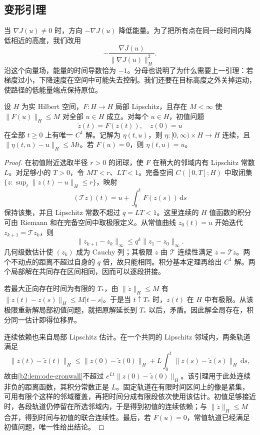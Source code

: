 \subsection{变形引理}
\label{b2:subsec:140502}

当 \(\nabla J(u)\ne0\) 时，方向 \(-\nabla J(u)\) 降低能量。为了把所有点在同一段时间内降低相近的高度，我们改用
\[
 -\frac{\nabla J(u)}{\|\nabla J(u)\|_H^2}.
\]
沿这个向量场，能量的时间导数恰为 \(-1\)。分母也说明了为什么需要上一引理：若梯度过小，下降速度在空间中可能失去控制。我们还要在目标高度之外关掉运动，使路径的低能量端点保持原位。

\begin{lemma}\label{b2:lem:14-hilbert-flow}
设 \(H\) 为实 Hilbert 空间，\(F:H\to H\) 局部 Lipschitz，且存在 \(M<\infty\) 使 \(\|F(u)\|_H\le M\) 对全部 \(u\in H\) 成立。对每个 \(u\in H\)，初值问题
\[
 \dot z(t)=F(z(t)),\quad z(0)=u
\]
在全部 \(t\ge0\) 上有唯一 \(C^1\) 解。记解为 \(\eta(t,u)\)，则 \(\eta:[0,\infty)\times H\to H\) 连续，且 \(\|\eta(t,u)-u\|_H\le Mt\)。若 \(F(u)=0\)，则 \(\eta(t,u)=u\)。
\end{lemma}
\begin{proof}
在初值附近选取半径 \(r>0\) 的闭球，使 \(F\) 在稍大的邻域内有 Lipschitz 常数 \(L\)。对足够小的 \(T>0\)，令 \(MT<r\)、\(LT<1\)。完备空间 \(C([0,T];H)\) 中取闭集
\(\{z:\sup_t\|z(t)-u\|_H\le r\}\)，映射
\[
 (\mathcal Tz)(t)=u+\int_0^tF(z(s))\,\mathrm ds
\]
保持该集，并且 Lipschitz 常数不超过 \(q=LT<1\)。这里连续的 \(H\) 值函数的积分可由 Riemann 和在完备空间中取极限定义。从常值曲线 \(z_0(t)=u\) 开始迭代 \(z_{k+1}=\mathcal Tz_k\)，则
\[
 \|z_{k+1}-z_k\|_\infty\le q^k\|z_1-z_0\|_\infty.
\]
几何级数估计使 \((z_k)\) 成为 Cauchy 列；其极限 \(z\) 由 \(\mathcal T\) 连续性满足 \(z=\mathcal Tz\)。两个不动点的距离不超过自身的 \(q\) 倍，故只能相同。积分基本定理再给出 \(C^1\) 解。两个局部解在共同存在区间相同，因而可以逐段拼接。

若最大正向存在时间为有限的 \(T_*\)，由 \(\|\dot z\|_H\le M\) 有
\(\|z(t)-z(s)\|_H\le M|t-s|\)。于是当 \(t\uparrow T_*\) 时，\(z(t)\) 在 \(H\) 中有极限。从该极限重新解局部初值问题，就把原解延长到 \(T_*\) 以后，矛盾。因此解全局存在，积分同一估计即得位移界。

连续依赖也来自局部 Lipschitz 估计。在一个共同的 Lipschitz 邻域内，两条轨道满足
\[
 \|z(t)-\widetilde z(t)\|_H
 \le \|z(0)-\widetilde z(0)\|_H
      +L\int_0^t\|z(s)-\widetilde z(s)\|_H\,\mathrm ds,
\]
故由\cref{b2:lem:ode-gronwall}不超过 \(e^{Lt}\|z(0)-\widetilde z(0)\|_H\)。该引理用于此处连续非负的距离函数，其积分常数正是 \(L\)。固定轨道在有限时间区间上的像是紧集，可用有限个这样的邻域覆盖，再把时间分成有限段依次使用该估计。初值足够接近时，各段轨道仍停留在所选邻域内，于是得到初值的连续依赖；与 \(\|\dot z\|_H\le M\) 合并，得到时间与初值的联合连续性。最后，若 \(F(u)=0\)，常值轨道已经满足初值问题，唯一性给出结论。
\end{proof}

